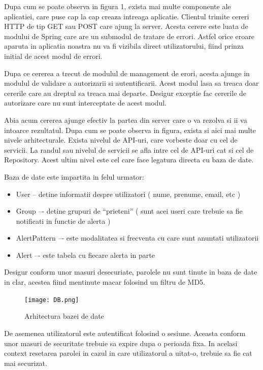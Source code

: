 \documentclass[conference]{IEEEtran}
\begin{document}
Dupa cum se poate observa in figura 1, exista mai multe componente ale aplicatiei, care puse cap la cap creaza intreaga aplicatie. Clientul trimite cereri HTTP de tip GET sau POST care ajung la server. Acesta cerere este luata de modului de Spring care are un submodul de tratare de errori. Astfel orice eroare aparuta in aplicatia noastra nu va fi vizibila direct utilizatorului, fiind prinza initial de acest modul de errori.

Dupa ce cererea a trecut de modulul de management de erori, acesta ajunge in modulul de validare a autorizarii si autentificarii. Acest modul lasa sa treaca doar cererile care au dreptul sa treaca mai departe. Desigur exceptie fac cererile de autorizare care nu sunt interceptate de acest modul.

Abia acum cererea ajunge efectiv la partea din server care o va rezolva si ii va intoarce rezultatul. Dupa cum se poate observa in figura, exista si aici mai multe nivele arhitecturale. Exista nivelul de API-uri, care vorbeste doar cu cel de servicii. La randul sau nivelul de servicii se afla intre cel de API-uri cat si cel de Repository. Acest ultim nivel este cel care face legatura directa cu baza de date.

Baza de date este impartita in felul urmator:
\begin{itemize}
  \item User -- detine informatii despre utilizatori ( nume, prenume, email, etc )
  \item Group –- detine grupuri de “prieteni” ( sunt acei useri care trebuie sa fie notificati in functie de alerta )
  \item AlertPattern –- este modalitatea si frecventa cu care sunt anuntati utilizatorii
  \item Alert –- este tabela cu fiecare alerta in parte 
\end{itemize}

Desigur conform unor masuri desecuriate, parolele nu sunt tinute in baza de date in clar, acestea fiind mentinute macar folosind un filtru de MD5.


\begin{figure}[ht!]
\centering
\texttt{[image: DB.png]}
\caption{Arhitectura bazei de date}
\label{overflow}
\end{figure}

De asemenea utilizatorul este autentificat folosind o sesiune. Aceasta conform unor masuri de securitate trebuie sa expire dupa o perioada fixa. In acelasi context resetarea parolei in cazul in care utilizatorul a uitat-o, trebuie sa fie cat mai securizat.
\end{document}
